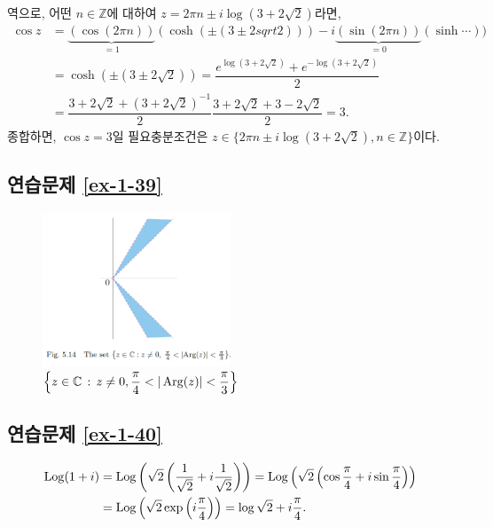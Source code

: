 역으로, 어떤 $n\in\mathbb Z$에 대하여 $z=2\pi n \pm i \log(3+2\sqrt{2})$라면,
\begin{align*}
\cos z &= \underbrace{(\cos(2\pi n))}_{=1} (\cosh (\pm(3\pm2sqrt{2})))
- i \underbrace{(\sin(2\pi n))}_{=0}(\sinh \cdots)) \\
&= \cosh(\pm(3\pm 2\sqrt{2})) = \dfrac{e^{\log(3+2\sqrt{2})}+ e^{-\log(3+2\sqrt{2})}}2 \\
&= \dfrac{3+2\sqrt{2} + (3+2\sqrt{2})^{-1}}2 
\dfrac{3+2\sqrt{2} + 3-2\sqrt{2}}2 = 3.
\end{align*}
종합하면, $\cos z =3$일 필요충분조건은
$z \in \{ 2\pi n \pm i \log(3+2\sqrt{2}), n\in\mathbb Z\}$이다.

\subsection*{연습문제 \ref{ex-1-39}}

\begin{figure}[h!]
\begin{center}
\includegraphics[width=0.5\textwidth]{./Solution/figs/fig-5-14}
\end{center}
\caption{$\left\{ z \in\mathbb C \,:\, z\ne0, \displaystyle\frac\pi4 < |\mathop{\mathrm{Arg}}(z)| < \displaystyle\frac\pi3 \right\}$
}
\label{fig-5-14}
\end{figure}

\subsection*{연습문제 \ref{ex-1-40}}

\begin{align*}
\mathop{\mathrm{Log}}(1+i) &= \mathop{\mathrm{Log}}\left( \sqrt{2} \left( \displaystyle\frac1{\sqrt{2}} + i \displaystyle\frac1{\sqrt{2}} \right)\right)
= \mathop{\mathrm{Log}}\left( \sqrt{2} \left( \cos\displaystyle\frac\pi4 + i \sin\displaystyle\frac\pi4 \right)\right) \\
&= \mathop{\mathrm{Log}}\left(\sqrt{2}\exp\left(i \displaystyle\frac\pi4\right)\right) = \log\sqrt{2} + i \displaystyle\frac\pi4.
\end{align*}

